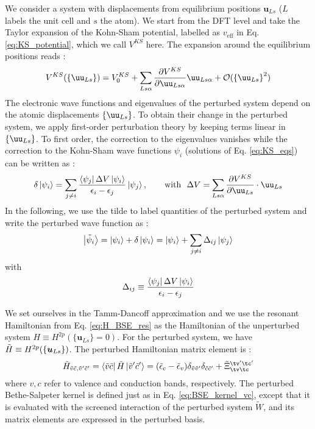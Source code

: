 We consider a system with displacements from equilibrium positions $\boldsymbol{u}_{Ls}$ ($L$ labels the unit cell and $s$ the atom). We start from the \acrshort{DFT} level and take the Taylor expansion of the Kohn-Sham potential, labelled as $v_{\text{eff}}$ in Eq. \eqref{eq:KS_potential}, which we call $V^{KS}$ here. The expansion around the equilibrium positions reads :
\begin{equation}
    V^{KS}(\left\{ \uu_{Ls} \right\}) = V_0^{KS} + \sum_{Ls\alpha} \frac{\partial V^{KS}}{\partial \uu_{Ls\alpha}} \uu_{Ls\alpha} + \mathcal{O}(\left\{ \uu_{Ls} \right\}^2)
\end{equation}
The electronic wave functions and eigenvalues of the perturbed system depend on the atomic displacements $\left\{ \uu_{Ls} \right\}$. To obtain their change in the perturbed system, we apply first-order perturbation theory by keeping terms linear in $\left\{ \uu_{Ls} \right\}$. To first order, the correction to the eigenvalues vanishes while the correction to the Kohn-Sham wave functions $\psi_i$ (solutions of Eq. \eqref{eq:KS_eqs}) can be written as : 
\begin{equation}
    \delta\ket{\psi_i} = \sum_{j\neq i} \frac{\bra{\psi_j} \Delta V \ket{\psi_i}}{\epsilon_i - \epsilon_j} \ket{\psi_j}, \qquad \text{with} \ \ \Delta V = \sum_{Ls\alpha}\frac{\partial V^{KS}}{\partial \uu_{Ls}}\cdot \uu_{Ls}
\end{equation}
In the following, we use the tilde to label quantities of the perturbed system and write the perturbed wave function as :
\begin{equation}
    \ket{\tilde{\psi}_i} = \ket{\psi_i} + \delta\ket{\psi_i} = \ket{\psi_i} + \sum_{j \neq i} \Delta_{ij} \ket{\psi_j} \label{eq:perturb_wf}
\end{equation}
with
\begin{equation}
    \Delta_{ij} \equiv \frac{\bra{\psi_j} \Delta V \ket{\psi_i}}{\epsilon_i - \epsilon_j} \label{eq:Delta_var}
\end{equation}

We set ourselves in the Tamm-Dancoff approximation and we use the resonant Hamiltonian from Eq. \eqref{eq:H_BSE_res} as the  Hamiltonian of the unperturbed system $H \equiv H^{2p}(\{\boldsymbol{u}_{Ls} \}=0)$. For the perturbed system, we have $\Tilde{H} \equiv H^{2p}(\{\boldsymbol{u}_{Ls} \})$. 
The perturbed Hamiltonian matrix element is :
\begin{equation}
    \Tilde{H}_{\Tilde{v}\Tilde{c},\Tilde{v}'\Tilde{c}'}  = \bra{\Tilde{v}\Tilde{c}} \tilde{H} \ket{\Tilde{v}'\Tilde{c}'}  = ( \Tilde{\epsilon}_c - \Tilde{\epsilon}_v ) \delta_{\Tilde{v}\Tilde{v}'}\delta_{\Tilde{c}\Tilde{c}'} + \tilde{\Xi}_{\tv\tc}^{\tv'\tc'} \label{eq:perturbed_BSE}
\end{equation}
where $v,c$ refer to valence and conduction bands, respectively.
The perturbed Bethe-Salpeter kernel is defined just as in Eq. \eqref{eq:BSE_kernel_vc}, except that it is evaluated with the screened interaction of the perturbed system $\tilde{W}$, and its matrix elements are expressed in the perturbed basis.

